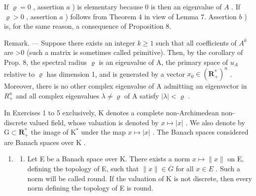 If \(\varrho = 0\) , assertion \(a\) ) is elementary because 0 is then an eigenvalue of \(A\) . If \(\varrho > 0\) , assertion \(a\) ) follows from Theorem 4 in view of Lemma 7. Assertion \(b\) ) is, for the same reason, a consequence of Proposition 8.

Remark. --- Suppose there exists an integer \(k \geqslant 1\) such that all coefficients of \(A^{k}\) are \textgreater0 (such a matrix is sometimes called primitive). Then, by the corollary of Prop. 8, the spectral radius \(\varrho\) is an eigenvalue of A, the primary space of \(u_{A}\) relative to \(\varrho\) has dimension 1, and is generated by a vector \(x_{0} \in (\mathbf{R}_{+}^{*})^{n}\) . Moreover, there is no other complex eigenvalue of A admitting an eigenvector in \(R_{+}^{n}\) and all complex eigenvalues \(\lambda \neq \varrho\) of A satisfy \(|\lambda| < \varrho\) .


\exercisesection{}

In Exercises 1 to 5 exclusively, K denotes a complete non-Archimedean non-discrete valued field, whose valuation is denoted by \(x \mapsto |x|\) . We also denote by \(\mathrm{G} \subset \mathbf{R}_{+}^{*}\) the image of \(\mathrm{K}^{*}\) under the map \(x \mapsto |x|\) . The Banach spaces considered are Banach spaces over \(\mathrm{K}\) .

\begin{enumerate}
\def\labelenumi{\arabic{enumi})}
\tightlist
\item
  \begin{enumerate}
  \def\labelenumii{\alph{enumii})}
  \tightlist
  \item
    Let E be a Banach space over K. There exists a norm \(x \mapsto \|x\|\) on E, defining the topology of E, such that \(\|x\| \in \overline{G}\) for all \(x \in E\) . Such a norm will be called round. If the valuation of K is not discrete, then every norm defining the topology of E is round.
  \end{enumerate}
\end{enumerate}

